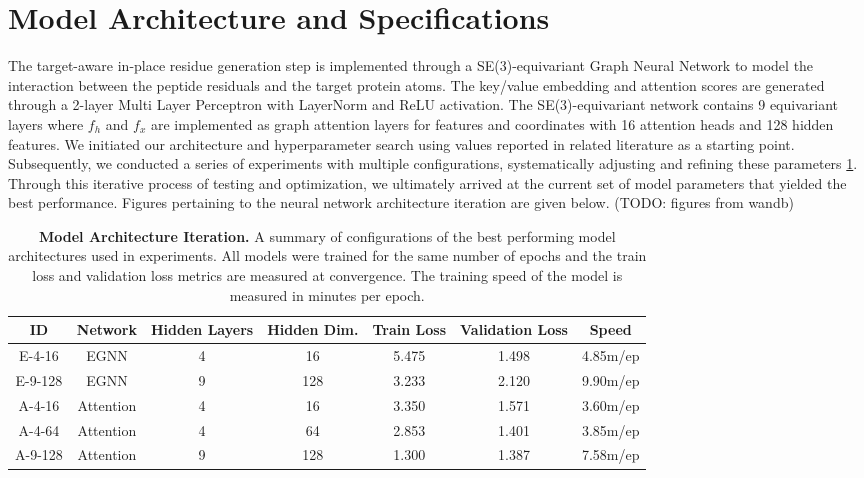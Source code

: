 \section{Model Architecture and Specifications}
The target-aware in-place residue generation step is implemented through a SE(3)-equivariant Graph Neural Network to model the interaction between the peptide residuals and the target protein atoms. The key/value embedding and attention scores are generated through a 2-layer Multi Layer Perceptron with LayerNorm and ReLU activation.
The SE(3)-equivariant network contains 9 equivariant layers where $f_h$ and $f_x$ are implemented as graph attention layers for features and coordinates with 16 attention heads and 128 hidden features. We initiated our architecture and hyperparameter search using values reported in related literature \cite{guan20233d} as a starting point. Subsequently, we conducted a series of experiments with multiple configurations, systematically adjusting and refining these parameters \ref{tab:iteration}. Through this iterative process of testing and optimization, we ultimately arrived at the current set of model parameters that yielded the best performance. Figures pertaining to the neural network architecture iteration are given below. (TODO: figures from wandb) \\

\begin{table}[ht]
\centering
\renewcommand{\arraystretch}{1.5}
\begin{tabular}{|c|c|c|c|c|c|c|}
      \hline
      \textbf{ID}      & \textbf{Network}   & \textbf{Hidden Layers} & \textbf{Hidden Dim.} & \textbf{Train Loss} & \textbf{Validation Loss} & \textbf{Speed}    \\
      \hline
      E-4-16  & EGNN      & 4             & 16          & 5.475      & 1.498           & 4.85m/ep  \\
      E-9-128 & EGNN      & 9             & 128         & 3.233      & 2.120           & 9.90m/ep  \\
      A-4-16  & Attention & 4             & 16          & 3.350      & 1.571           & 3.60m/ep  \\
      A-4-64  & Attention & 4             & 64          & 2.853      & 1.401           & 3.85m/ep  \\
      A-9-128 & Attention & 9             & 128         & 1.300      & 1.387           & 7.58m/ep  \\

      \hline
\end{tabular}
\renewcommand{\arraystretch}{1}
\caption{\textbf{Model Architecture Iteration.} A summary of configurations of the best performing model architectures used in experiments. All models were trained for the same number of epochs and the train loss and validation loss metrics are measured at convergence. The training speed of the model is measured in minutes per epoch.}  
\label{tab:iteration}
\end{table}

